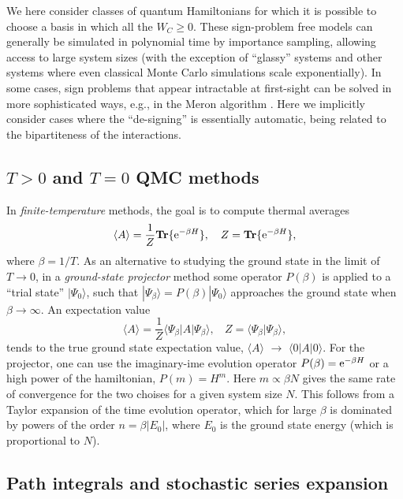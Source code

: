 \documentclass[range]{ar2e}
\begin{document}
We here consider classes of quantum Hamiltonians for which it is possible to choose a basis in which all 
the $W_C\geq 0$. These sign-problem free models can generally be simulated in polynomial time by 
importance sampling, allowing access to large system sizes (with the exception of ``glassy'' systems and
other systems where even classical Monte Carlo simulations scale exponentially). In some cases, sign problems that
appear intractable at first-sight can be solved in more sophisticated ways, e.g., in the Meron algorithm \cite{Chandrasekharan99}. 
Here we implicitly consider cases where the ``de-signing'' is essentially automatic, being related to the bipartiteness 
of the interactions.
 
\subsection{$T>0$ and $T=0$ QMC methods}
\label{ss:method}

In {\it finite-temperature} methods, the goal is to compute thermal averages
\begin{equation}
\langle A\rangle = \frac{1}{Z}{\bf Tr}\{ {\rm e}^{-\beta H}\},~~~
Z = {\bf Tr}\{ {\rm e}^{-\beta H}\},
\label{za1}
\end{equation}
where $\beta=1/T$. As an alternative to studying the ground state in the limit of  $T\to 0$, in a {\it ground-state projector} method some 
operator $P(\beta)$  is applied to a ``trial state'' $|\Psi_0\rangle$, such that $|\Psi_\beta \rangle = P(\beta)|\Psi_0\rangle$ approaches the 
ground state when $\beta \to \infty$. An expectation value
\begin{equation}
\langle A\rangle = \frac{1}{Z}\langle \Psi_\beta|A|\Psi_\beta\rangle,~~~~ Z = \langle \Psi_\beta|\Psi_\beta\rangle,
\label{za2}
\end{equation}
tends to the true ground state expectation value, $\langle A\rangle$ $\to$ $\langle 0| A|0\rangle$. For the projector, one can use the imaginary-ime
evolution operator $P(\beta)={\rm e}^{-\beta H}$ or a high power of the hamiltonian, $P(m)=H^m$. Here $m \propto \beta N$ gives the same rate of 
convergence for the two choises for a given system size $N$. This follows from a Taylor expansion of the time evolution operator, which for large 
$\beta$ is dominated by powers of the order $n=\beta |E_0|$, where $E_0$ is the ground state energy (which is proportional to $N$).

\subsection{Path integrals and stochastic series expansion}
\end{document}
